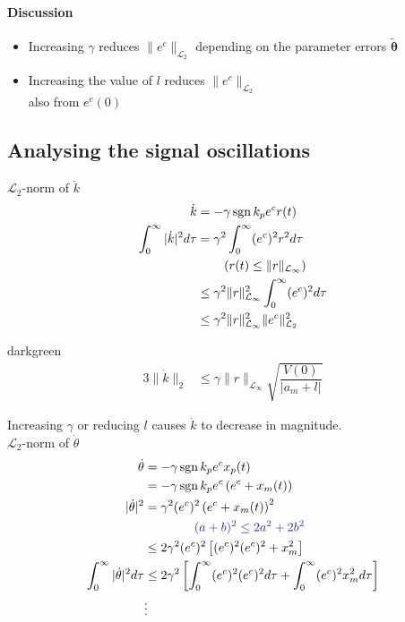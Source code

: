 \paragraph{Discussion}
\begin{itemize}
\item Increasing $\gamma$ reduces $\| e^c \|_{\mathcal{L}_2}$
    depending on the parameter errors $ \tilde{\bm{\theta}}$ 
\item Increasing the value of $l$ reduces $\| e^c \|_{\mathcal{L}_2}$\\
    also from $e^c(0)$
\end{itemize}

\subsection{Analysing the signal oscillations}
$\mathcal{L}_2$-norm of $\dot{k}$
\begin{alignat*}{3}
\dot{k} &= -\gamma \operatorname{sgn}{k_p} e^c r(t)\\
\int_0^\infty |\dot{k}|^2 d\tau &= \gamma^2 \int_0^\infty (e^c)^2r^2 d\tau\\
    & \qquad \left( r(t) \leq \| r \|_{\mathcal{L}_\infty} \right)\\
    &\leq \gamma^2 \| r \|^2_{\mathcal{L}_\infty} \int_0^\infty (e^c)^2 d\tau\\
    &\leq \gamma^2 \| r \|^2_{\mathcal{L}_\infty} \| e^c \|^2_{\mathcal{L}_2}\\
\end{alignat*}

\begin{conclusion}{darkgreen}
\begin{alignat*}{3}
\| \dot{k} \|_2 &\leq \gamma \| r \|_{\mathcal{L}_\infty}
    \sqrt{\dfrac{V(0)}{|a_m + l|}}
\end{alignat*}
\end{conclusion}

Increasing $\gamma$ or reducing $l$ causes $\dot{k}$ to decrease in magnitude.\\

$\mathcal{L}_2$-norm of $\dot{\theta}$
\begin{alignat*}{3}
\dot{\theta} &= -\gamma \sign{k_p} e^c x_p(t)\\
    &= -\gamma \sign{k_p} e^c \left( e^c + x_m(t) \right)\\
|\dot{\theta}|^2 &= \gamma^2 (e^c)^2 \left( e^c + x_m(t) \right)^2\\
    & \qquad \qquad  \measuredVar{ (a+b)^2 \leq 2a^2 + 2b^2} \\
    &\leq 2 \gamma^2 (e^c)^2 \left[ (e^c)^2 (e^c)^2 + x_m^2 \right]\\
\int_0^\infty |\dot{\theta}|^2 d\tau
    &\leq 2\gamma^2 \left[ \int_0^\infty (e^c)^2 (e^c)^2 d\tau +
        \int_0^\infty (e^c)^2 x_m^2 d\tau \right]\\
    &\vdots\\
\end{alignat*}


